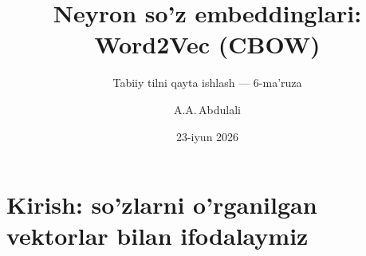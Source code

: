 \documentclass[aspectratio=169,11pt]{beamer}
\title[Word2Vec (CBOW)]{Neyron so'z embeddinglari: Word2Vec (CBOW)}
\subtitle{Tabiiy tilni qayta ishlash --- 6-ma'ruza}
\author[A.A.\,Abdulali]{A.A.\,Abdulali}
\date{23-iyun 2026}
\institute{11:00--12:20 \quad$\cdot$\quad mavzu \textnumero{}6}
\begin{document}

\maketitle

\section[Kirish]{Kirish: so'zlarni o'rganilgan vektorlar bilan ifodalaymiz}
\end{document}
